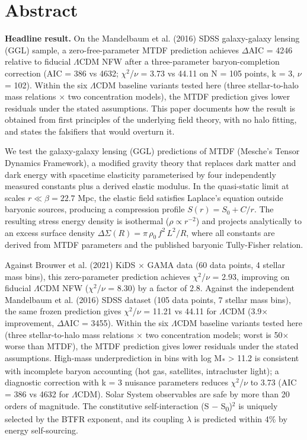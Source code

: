 \documentclass[11pt,a4paper]{article}
\begin{document}
\section{Abstract}
\label{sec:abstract}
\textbf{Headline result.} On the Mandelbaum et al. (2016) SDSS galaxy-galaxy lensing (GGL) sample, a zero-free-parameter MTDF prediction achieves $\Delta$AIC = 4246 relative to fiducial $\Lambda$CDM NFW after a three-parameter baryon-completion correction (AIC = 386 vs 4632; $\chi$$^{2}$/$\nu$ = 3.73 vs 44.11 on N = 105 points, k = 3, $\nu$ = 102). Within the six $\Lambda$CDM baseline variants tested here (three stellar-to-halo mass relations $\times$ two concentration models), the MTDF prediction gives lower residuals under the stated assumptions. This paper documents how the result is obtained from first principles of the underlying field theory, with no halo fitting, and states the falsifiers that would overturn it.

We test the galaxy-galaxy lensing (GGL) predictions of MTDF (Mesche's Tensor Dynamics Framework), a modified gravity theory that replaces dark matter and dark energy with spacetime elasticity parameterised by four independently measured constants plus a derived elastic modulus. In the quasi-static limit at scales \(r \ll \beta = 22.7\) Mpc, the elastic field satisfies Laplace's equation outside baryonic sources, producing a compression profile \(S(r) = S_0 + C/r\). The resulting stress energy density is isothermal (\(\rho \propto r^{-2}\)) and projects analytically to an excess surface density \(\Delta\Sigma(R) = \pi\,\rho_0\,f^2\,L^2 / R\), where all constants are derived from MTDF parameters and the published baryonic Tully-Fisher relation.

Against Brouwer et al. (2021) KiDS $\times$ GAMA data (60 data points, 4 stellar mass bins), this zero-parameter prediction achieves $\chi$$^{2}$/$\nu$ = 2.93, improving on fiducial $\Lambda$CDM NFW ($\chi$$^{2}$/$\nu$ = 8.30) by a factor of 2.8. Against the independent Mandelbaum et al. (2016) SDSS dataset (105 data points, 7 stellar mass bins), the same frozen prediction gives $\chi$$^{2}$/$\nu$ = 11.21 vs 44.11 for $\Lambda$CDM (3.9$\times$ improvement, $\Delta$AIC = 3455). Within the six $\Lambda$CDM baseline variants tested here (three stellar-to-halo mass relations $\times$ two concentration models; worst is 50$\times$ worse than MTDF), the MTDF prediction gives lower residuals under the stated assumptions. High-mass underprediction in bins with log M\textsubscript{*} > 11.2 is consistent with incomplete baryon accounting (hot gas, satellites, intracluster light); a diagnostic correction with k = 3 nuisance parameters reduces $\chi$$^{2}$/$\nu$ to 3.73 (AIC = 386 vs 4632 for $\Lambda$CDM). Solar System observables are safe by more than 20 orders of magnitude. The constitutive self-interaction (S $-$ S\textsubscript{0})$^{2}$ is uniquely selected by the BTFR exponent, and its coupling $\lambda$ is predicted within 4\% by energy self-sourcing.
\end{document}
